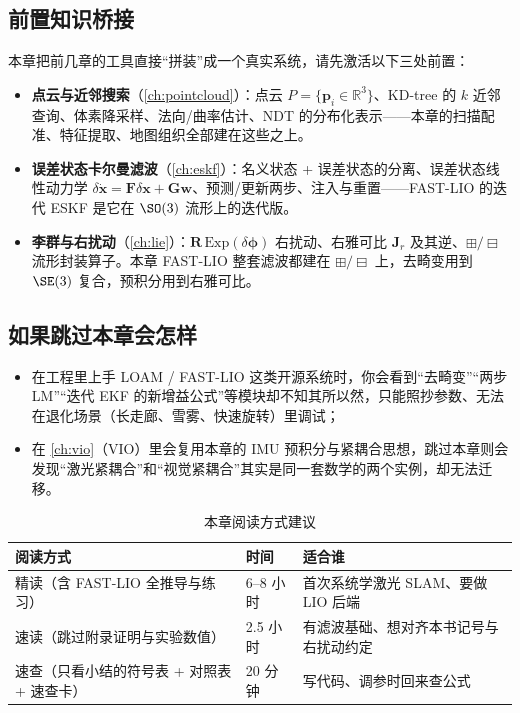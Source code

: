 \subsection*{前置知识桥接}
本章把前几章的工具直接“拼装”成一个真实系统，请先激活以下三处前置：
\begin{itemize}
  \item \textbf{点云与近邻搜索}（\cref{ch:pointcloud}）：点云 $P=\{\mathbf{p}_i\in\mathbb{R}^3\}$、KD-tree 的 $k$ 近邻查询、体素降采样、法向/曲率估计、NDT 的分布化表示——本章的扫描配准、特征提取、地图组织全部建在这些之上。
  \item \textbf{误差状态卡尔曼滤波}（\cref{ch:eskf}）：名义状态 + 误差状态的分离、误差状态线性动力学 $\delta\dot{\mathbf{x}}=\mathbf{F}\delta\mathbf{x}+\mathbf{G}\mathbf{w}$、预测/更新两步、注入与重置——FAST-LIO 的迭代 ESKF 是它在 $\SO(3)$ 流形上的迭代版。
  \item \textbf{李群与右扰动}（\cref{ch:lie}）：$\mathbf{R}\,\mathrm{Exp}(\delta\boldsymbol{\phi})$ 右扰动、右雅可比 $\mathbf{J}_r$ 及其逆、$\boxplus/\boxminus$ 流形封装算子。本章 FAST-LIO 整套滤波都建在 $\boxplus/\boxminus$ 上，去畸变用到 $\SE(3)$ 复合，预积分用到右雅可比。
\end{itemize}

\subsection*{如果跳过本章会怎样}
\begin{itemize}
  \item 在工程里上手 LOAM / FAST-LIO 这类开源系统时，你会看到“去畸变”“两步 LM”“迭代 EKF 的新增益公式”等模块却不知其所以然，只能照抄参数、无法在退化场景（长走廊、雪雾、快速旋转）里调试；
  \item 在 \cref{ch:vio}（VIO）里会复用本章的 IMU 预积分与紧耦合思想，跳过本章则会发现“激光紧耦合”和“视觉紧耦合”其实是同一套数学的两个实例，却无法迁移。
\end{itemize}

\begin{table}[H]\centering\small
\caption{本章阅读方式建议}
\label{tab:lidar-reading}
\begin{tabular}{lll}
\toprule
阅读方式 & 时间 & 适合谁 \\
\midrule
精读（含 FAST-LIO 全推导与练习） & 6--8 小时 & 首次系统学激光 SLAM、要做 LIO 后端 \\
速读（跳过附录证明与实验数值） & 2.5 小时 & 有滤波基础、想对齐本书记号与右扰动约定 \\
速查（只看小结的符号表 + 对照表 + 速查卡） & 20 分钟 & 写代码、调参时回来查公式 \\
\bottomrule
\end{tabular}
\end{table}

